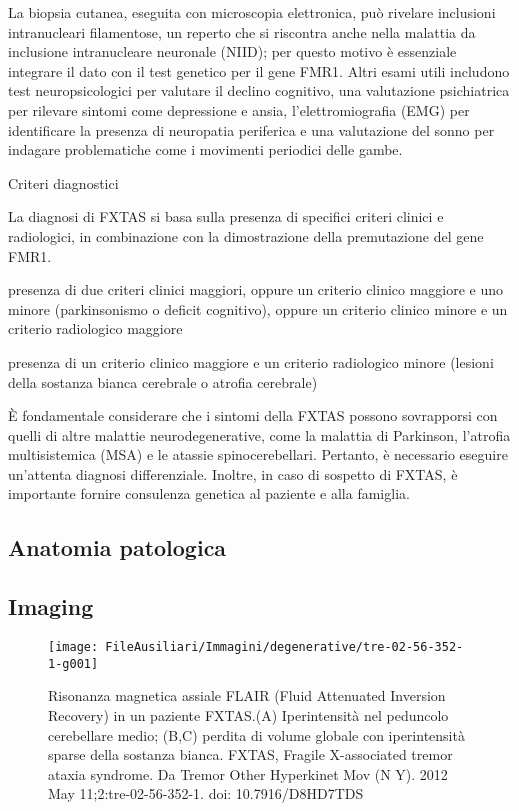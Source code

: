 La biopsia cutanea, eseguita con microscopia elettronica, può rivelare inclusioni intranucleari filamentose, un reperto che si riscontra anche nella malattia da inclusione intranucleare neuronale (NIID); per questo motivo è essenziale integrare il dato con il test genetico per il gene FMR1. Altri esami utili includono test neuropsicologici per valutare il declino cognitivo, una valutazione psichiatrica per rilevare sintomi come depressione e ansia, l'elettromiografia (EMG) per identificare la presenza di neuropatia periferica e una valutazione del sonno per indagare problematiche come i movimenti periodici delle gambe.
\begin{TitoloIntro}[colbacktitle=red]{Criteri diagnostici}
{
La diagnosi di FXTAS si basa sulla presenza di specifici criteri clinici e radiologici, in combinazione con la dimostrazione della premutazione del gene FMR1.
\begin{description}[style=unboxed,leftmargin=0cm]
\item[FXTAS probabile]{presenza di due criteri clinici maggiori, oppure un criterio clinico maggiore e uno minore (parkinsonismo o deficit cognitivo), oppure un criterio clinico minore e un criterio radiologico maggiore}
\item[FXTAS possibile]{presenza di un criterio clinico maggiore e un criterio radiologico minore (lesioni della sostanza bianca cerebrale o atrofia cerebrale)}
\end{description}
}
\end{TitoloIntro}
È fondamentale considerare che i sintomi della FXTAS possono sovrapporsi con quelli di altre malattie neurodegenerative, come la malattia di Parkinson, l'atrofia multisistemica (MSA) e le atassie spinocerebellari. Pertanto, è necessario eseguire un'attenta diagnosi differenziale. Inoltre, in caso di sospetto di FXTAS, è importante fornire consulenza genetica al paziente e alla famiglia.

\subsection{Anatomia patologica}

\subsection{Imaging}

\begin{figure*}[h]
	\centering
	\texttt{[image: FileAusiliari/Immagini/degenerative/tre-02-56-352-1-g001]}
	\caption[fxtas-flair]{Risonanza magnetica assiale FLAIR (Fluid Attenuated Inversion Recovery) in un paziente FXTAS.(A) Iperintensità nel peduncolo cerebellare medio; (B,C) perdita di volume globale con iperintensità sparse della sostanza bianca. FXTAS, Fragile X-associated tremor ataxia syndrome. Da Tremor Other Hyperkinet Mov (N Y). 2012 May 11;2:tre-02-56-352-1. doi: 10.7916/D8HD7TDS}
	\label{fig:tre-02-56-352-1-g001}
\end{figure*}

